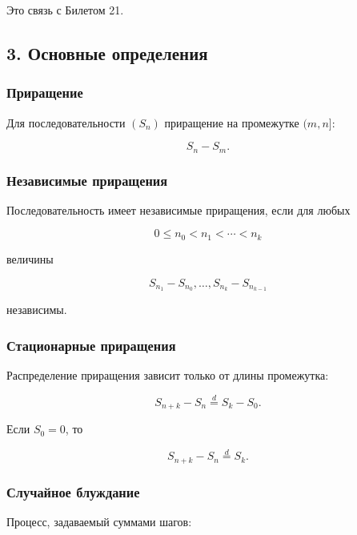 \documentclass[
  11pt,
  a4paper,
]{article}
\begin{document}
Это связь с Билетом 21.

\subsection{3. Основные
определения}\label{ux43eux441ux43dux43eux432ux43dux44bux435-ux43eux43fux440ux435ux434ux435ux43bux435ux43dux438ux44f}

\subsubsection{Приращение}\label{ux43fux440ux438ux440ux430ux449ux435ux43dux438ux435}

Для последовательности \((S_n)\) приращение на промежутке \((m,n]\):

\[
S_n-S_m.
\]

\subsubsection{Независимые
приращения}\label{ux43dux435ux437ux430ux432ux438ux441ux438ux43cux44bux435-ux43fux440ux438ux440ux430ux449ux435ux43dux438ux44f}

Последовательность имеет независимые приращения, если для любых

\[
0\le n_0<n_1<\cdots<n_k
\]

величины

\[
S_{n_1}-S_{n_0},\ldots,S_{n_k}-S_{n_{k-1}}
\]

независимы.

\subsubsection{Стационарные
приращения}\label{ux441ux442ux430ux446ux438ux43eux43dux430ux440ux43dux44bux435-ux43fux440ux438ux440ux430ux449ux435ux43dux438ux44f-1}

Распределение приращения зависит только от длины промежутка:

\[
S_{n+k}-S_n\stackrel d=S_k-S_0.
\]

Если \(S_0=0\), то

\[
S_{n+k}-S_n\stackrel d=S_k.
\]

\subsubsection{Случайное
блуждание}\label{ux441ux43bux443ux447ux430ux439ux43dux43eux435-ux431ux43bux443ux436ux434ux430ux43dux438ux435-1}

Процесс, задаваемый суммами шагов:
\end{document}
